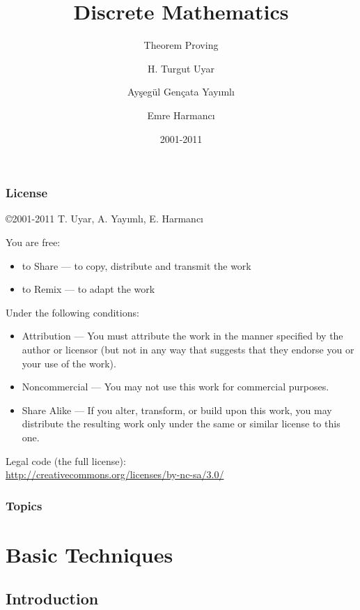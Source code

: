 \documentclass[dvipsnames]{beamer}
\title{Discrete Mathematics}
\subtitle{Theorem Proving}
\author{H. Turgut Uyar \and Ayşegül Gençata Yayımlı \and Emre Harmancı}
\date{2001-2011}
\begin{document}
\begin{frame}
  \titlepage
\end{frame}

\begin{frame}
  \frametitle{License}

  \hfill
  \copyright 2001-2011 T. Uyar, A. Yayımlı, E. Harmancı

  \vfill
  \begin{tiny}
    You are free:
    \begin{itemize}
      \item to Share — to copy, distribute and transmit the work
      \item to Remix — to adapt the work
    \end{itemize}

    Under the following conditions:
    \begin{itemize}
      \item Attribution — You must attribute the work in the manner specified by
        the author or licensor (but not in any way that suggests that they
        endorse you or your use of the work).

      \item Noncommercial — You may not use this work for commercial purposes.

      \item Share Alike — If you alter, transform, or build upon this work, you
        may distribute the resulting work only under the same or similar license
        to this one.
    \end{itemize}
  \end{tiny}

  \vfill
  Legal code (the full license):\\
  \url{http://creativecommons.org/licenses/by-nc-sa/3.0/}
\end{frame}

\begin{frame}
  \frametitle{Topics}
  \tableofcontents
\end{frame}

\section{Basic Techniques}

\subsection{Introduction}
\end{document}
